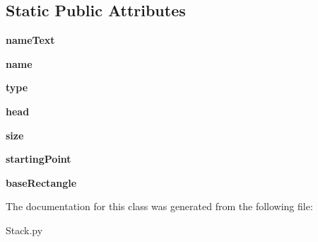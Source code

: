 \subsection*{Static Public Attributes}
\begin{DoxyCompactItemize}
\item 
\mbox{\label{class_stack_1_1_stack_a6da1cd9f8ad12a4158b548580bc8cb06}} 
{\bfseries name\+Text}
\item 
\mbox{\label{class_stack_1_1_stack_a816d228643737425943f5b3dcff47752}} 
{\bfseries name}
\item 
\mbox{\label{class_stack_1_1_stack_a04ed642405fc7683813607a2383ccd12}} 
{\bfseries type}
\item 
\mbox{\label{class_stack_1_1_stack_a8726f351e5a08290fa4481dfdd06dbd5}} 
{\bfseries head}
\item 
\mbox{\label{class_stack_1_1_stack_a88efefb17bc788be77ef8259f157b011}} 
{\bfseries size}
\item 
\mbox{\label{class_stack_1_1_stack_aff1a82eee850725bb5585d7a07b1f0ec}} 
{\bfseries starting\+Point}
\item 
\mbox{\label{class_stack_1_1_stack_ad6677753e14b1bbd2a8d464ed9d5cbac}} 
{\bfseries base\+Rectangle}
\end{DoxyCompactItemize}


The documentation for this class was generated from the following file\+:\begin{DoxyCompactItemize}
\item 
Stack.\+py\end{DoxyCompactItemize}
